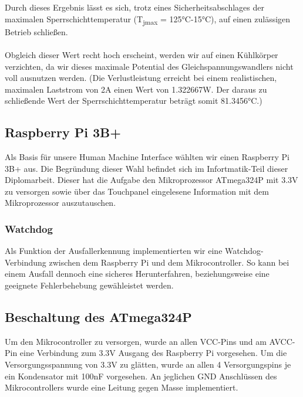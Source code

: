 Durch dieses Ergebnis lässt es sich, trotz eines Sicherheitsabschlages der maximalen Sperrschichttemperatur (T\textsubscript{jmax} = 125°C-15°C), auf einen zulässigen Betrieb schließen.\\\\
Obgleich dieser Wert recht hoch erscheint, werden wir auf einen Kühlkörper verzichten, da wir dieses maximale Potential des Gleichspannungswandlers nicht voll ausnutzen werden.
(Die Verlustleistung erreicht bei einem realistischen, maximalen Laststrom von 2A einen Wert von 1.322667W. Der daraus zu schließende Wert der Sperrschichttemperatur beträgt somit 81.3456°C.)

\subsection{Raspberry Pi 3B+}

Als Basis für unsere Human Machine Interface wählten wir einen Raspberry Pi 3B+ aus.
Die Begründung dieser Wahl befindet sich im Infortmatik-Teil dieser Diplomarbeit.
Dieser hat die Aufgabe den Mikroprozessor ATmega324P mit 3.3V zu versorgen sowie über das Touchpanel eingelesene Information mit dem Mikroprozessor auszutauschen.

\subsubsection{Watchdog}

Als Funktion der Ausfallerkennung implementierten wir eine Watchdog-Verbindung zwischen dem Raspberry Pi und dem Mikrocontroller.
So kann bei einem Ausfall dennoch eine sicheres Herunterfahren, beziehungsweise eine geeignete Fehlerbehebung gewähleistet werden.

\subsection{Beschaltung des ATmega324P}

Um den Mikrocontroller zu versorgen, wurde an allen VCC-Pins und am AVCC-Pin eine Verbindung zum 3.3V Ausgang des Raspberry Pi vorgesehen.
Um die Versorgungsspannung von 3.3V zu glätten, wurde an allen 4 Versorgungspins je ein Kondensator mit 100nF vorgesehen.
An jeglichen GND Anschlüssen des Mikrocontrollers wurde eine Leitung gegen Masse implementiert.


